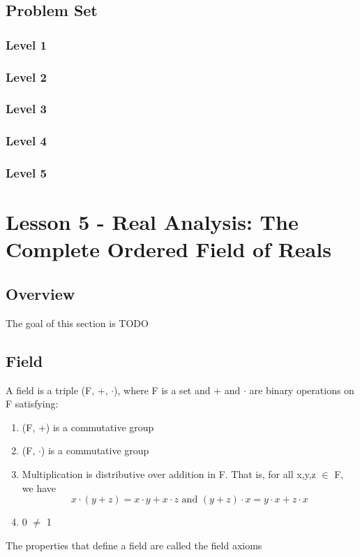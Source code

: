 \documentclass{article}
\begin{document}
\subsection{Problem Set}
\subsubsection{Level 1}
\subsubsection{Level 2}
\subsubsection{Level 3}
\subsubsection{Level 4}
\subsubsection{Level 5}
\pagebreak

\section{Lesson 5 - Real Analysis: The Complete Ordered Field of Reals}
\subsection{Overview}

The goal of this section is TODO

\subsection{Field}

\begin{definition}[Field]
    A field is a triple (F, +, $\cdot $), where F is a set and + and $ \cdot$
    are binary operations on F satisfying:
    \begin{enumerate}
	\item (F, +) is a commutative group
	\item (F, $\cdot $) is a commutative group
	\item Multiplication is distributive over addition in F. That is, for all
	    x,y,z $\in $ F, we have
	    $$ x \cdot (y+z) = x \cdot y + x \cdot z \text{ and }
	    (y+z) \cdot x = y \cdot x + z \cdot x $$
	\item 0 $\neq$ 1
    \end{enumerate}

    The properties that define a field are called the field axioms
\end{definition}
\end{document}
